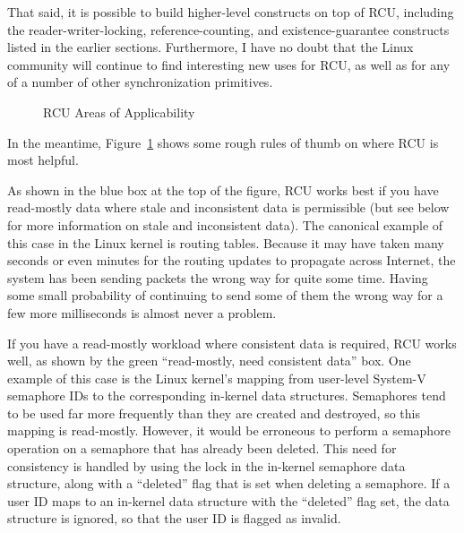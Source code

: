 That said, it is possible to build higher-level constructs
on top of RCU, including the reader-writer-locking, reference-counting,
and existence-guarantee constructs listed in the earlier sections.
Furthermore, I have no doubt that the Linux community will continue to
find interesting new uses for RCU,
as well as for any of a number of other synchronization primitives.

\begin{figure}[tbh]
\begin{center}
\end{center}
\caption{RCU Areas of Applicability}
\label{fig:defer:RCU Areas of Applicability}
\end{figure}

In the meantime,
Figure~\ref{fig:defer:RCU Areas of Applicability}
shows some rough rules of thumb on where RCU is most helpful.

As shown in the blue box at the top of the figure, RCU works best if
you have read-mostly data where stale and inconsistent
data is permissible (but see below for more information on stale and
inconsistent data).
The canonical example of this case in the Linux kernel is routing tables.
Because it may have taken many seconds or even minutes for the
routing updates to propagate across Internet, the system
has been sending packets the wrong way for quite some time.
Having some small probability of continuing to send some of them the wrong
way for a few more milliseconds is almost never a problem.

If you have a read-mostly workload where consistent data is required,
RCU works well, as shown by the green ``read-mostly, need consistent data''
box.
One example of this case is the Linux kernel's mapping from user-level
System-V semaphore IDs to the corresponding in-kernel data structures.
Semaphores tend to be used far more frequently than they are created
and destroyed, so this mapping is read-mostly.
However, it would be erroneous to perform a semaphore operation on
a semaphore that has already been deleted.
This need for consistency is handled by using the lock in the
in-kernel semaphore data structure, along with a ``deleted''
flag that is set when deleting a semaphore.
If a user ID maps to an in-kernel data structure with the
``deleted'' flag set, the data structure is ignored, so that
the user ID is flagged as invalid.

